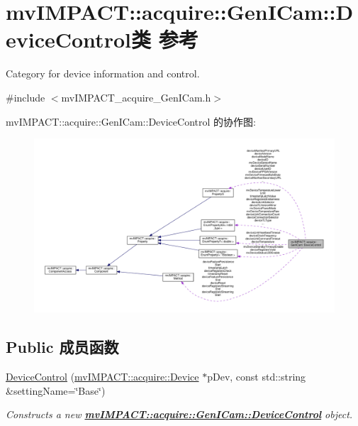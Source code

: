 \hypertarget{classmv_i_m_p_a_c_t_1_1acquire_1_1_gen_i_cam_1_1_device_control}{\section{mv\+I\+M\+P\+A\+C\+T\+:\+:acquire\+:\+:Gen\+I\+Cam\+:\+:Device\+Control类 参考}
\label{classmv_i_m_p_a_c_t_1_1acquire_1_1_gen_i_cam_1_1_device_control}
}


Category for device information and control.  




{\ttfamily \#include $<$mv\+I\+M\+P\+A\+C\+T\+\_\+acquire\+\_\+\+Gen\+I\+Cam.\+h$>$}



mv\+I\+M\+P\+A\+C\+T\+:\+:acquire\+:\+:Gen\+I\+Cam\+:\+:Device\+Control 的协作图\+:
\nopagebreak
\begin{figure}[H]
\begin{center}
\leavevmode
\includegraphics[width=350pt]{classmv_i_m_p_a_c_t_1_1acquire_1_1_gen_i_cam_1_1_device_control__coll__graph}
\end{center}
\end{figure}
\subsection*{Public 成员函数}
\begin{DoxyCompactItemize}
\item 
\hyperlink{classmv_i_m_p_a_c_t_1_1acquire_1_1_gen_i_cam_1_1_device_control_aa8fe708bc7cb141db42b52031edb1f30}{Device\+Control} (\hyperlink{classmv_i_m_p_a_c_t_1_1acquire_1_1_device}{mv\+I\+M\+P\+A\+C\+T\+::acquire\+::\+Device} $\ast$p\+Dev, const std\+::string \&setting\+Name=\char`\"{}Base\char`\"{})
\begin{DoxyCompactList}\small\item\em Constructs a new {\bfseries \hyperlink{classmv_i_m_p_a_c_t_1_1acquire_1_1_gen_i_cam_1_1_device_control}{mv\+I\+M\+P\+A\+C\+T\+::acquire\+::\+Gen\+I\+Cam\+::\+Device\+Control}} object. \end{DoxyCompactList}\end{DoxyCompactItemize}

